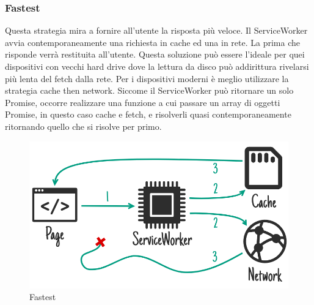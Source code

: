 \documentclass[11pt ,a4paper , twoside , openright ]{article}
\begin{document}
\subsubsection{Fastest}
Questa strategia mira a fornire all’utente la risposta più veloce. Il ServiceWorker avvia contemporaneamente una richiesta in cache ed una in rete. La prima che risponde verrà restituita all’utente.
Questa soluzione può essere l’ideale per quei dispositivi con vecchi hard drive dove la lettura da disco può addirittura rivelarsi più lenta del fetch dalla rete. Per i dispositivi moderni è meglio utilizzare la strategia cache then network.
Siccome il ServiceWorker può ritornare un solo Promise, occorre realizzare una funzione a cui passare un array di oggetti Promise, in questo caso cache e fetch, e risolverli quasi contemporaneamente ritornando quello che si risolve per primo.
\pagebreak

\begin{figure}[h]
	\centering
	\includegraphics[width=0.7\linewidth]{Strategia5}
	\caption{Fastest}
	\label{fig: Fastest}
\end{figure}
\end{document}
